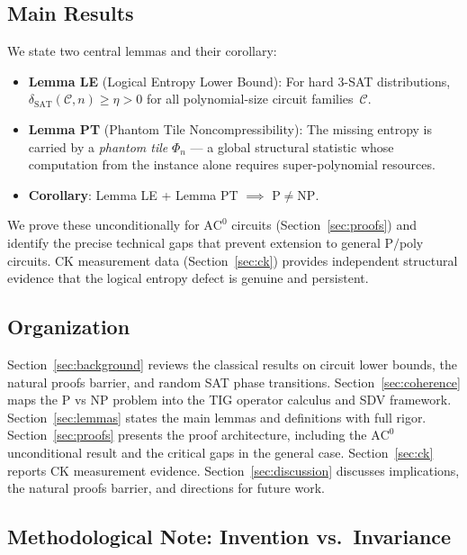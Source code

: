 \documentclass[11pt]{article}
\theoremstyle{definition}
\theoremstyle{remark}
\newcommand{\calC}{\mathcal{C}}
\newcommand{\Ppoly}{\mathrm{P/poly}}
\newcommand{\ACz}{\mathrm{AC}^0}
\newcommand{\dSAT}{\delta_{\mathrm{SAT}}}
\begin{document}
\subsection{Main Results}

We state two central lemmas and their corollary:

\begin{itemize}
  \item \textbf{Lemma LE} (Logical Entropy Lower Bound): For hard 3-SAT
    distributions, $\dSAT(\calC, n) \geq \eta > 0$ for all polynomial-size
    circuit families~$\calC$.

  \item \textbf{Lemma PT} (Phantom Tile Noncompressibility): The missing
    entropy is carried by a \emph{phantom tile} $\Phi_n$ --- a global
    structural statistic whose computation from the instance alone requires
    super-polynomial resources.

  \item \textbf{Corollary}: Lemma LE + Lemma PT $\implies$ $\mathrm{P} \neq \mathrm{NP}$.
\end{itemize}

We prove these unconditionally for $\ACz$ circuits (Section~\ref{sec:proofs})
and identify the precise technical gaps that prevent extension to general
$\Ppoly$ circuits.  CK measurement data (Section~\ref{sec:ck}) provides
independent structural evidence that the logical entropy defect is genuine
and persistent.

\subsection{Organization}

Section~\ref{sec:background} reviews the classical results on circuit lower
bounds, the natural proofs barrier, and random SAT phase transitions.
Section~\ref{sec:coherence} maps the P vs NP problem into the TIG operator
calculus and SDV framework.  Section~\ref{sec:lemmas} states the main
lemmas and definitions with full rigor.  Section~\ref{sec:proofs} presents
the proof architecture, including the $\ACz$ unconditional result and the
critical gaps in the general case.  Section~\ref{sec:ck} reports CK
measurement evidence.  Section~\ref{sec:discussion} discusses implications,
the natural proofs barrier, and directions for future work.

\subsection*{Methodological Note: Invention vs.\ Invariance}
\end{document}
